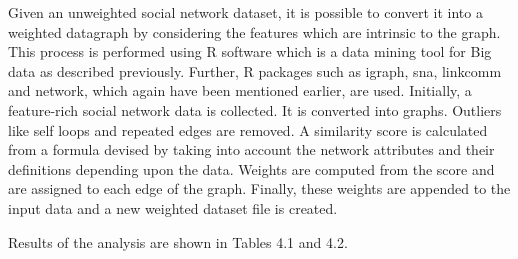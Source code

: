 
Given an unweighted social network dataset, it is possible to convert it into a weighted datagraph by
considering the features which are intrinsic to the graph. This process is performed using R software
which is a data mining tool for Big data as described previously. Further, R packages such as igraph,
sna, linkcomm and network, which again have been mentioned earlier, are used. Initially, a feature-rich
social network data is collected. It is converted into graphs. Outliers like self loops and repeated edges
are removed. A similarity score is calculated from a formula devised by taking into account the network
attributes and their definitions depending upon the data. Weights are computed from the score and are
assigned to each edge of the graph. Finally, these weights are appended to the input data and a new weighted dataset file is created.  

{}

Results of the analysis are shown in Tables 4.1 and 4.2.

